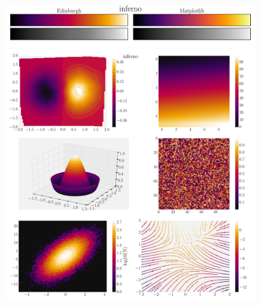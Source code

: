 \documentclass[10pt,a4paper]{article}
\begin{document}
\newpage
\begin{figure}[ht]
  \centering
  \includegraphics[width=0.99\textwidth]{infernoBars.pdf}
  \includegraphics[width=0.99\textwidth]{infernoExamples.pdf}
\end{figure}
\end{document}
